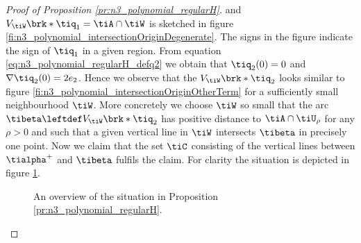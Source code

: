 \begin{proof}[Proof of Proposition \ref{pr:n3_polynomial_regularH}]
  and $V_{\tiW}\brk*{\tiq_1}=\tiA\cap\tiW$ is
  sketched in figure \ref{fi:n3_polynomial_intersectionOriginDegenerate}.
  The signs in the figure indicate the sign of $\tiq_1$ in a given region.
  From equation \eqref{eq:n3_polynomial_regularH_defq2}
  we obtain that $\tiq_2(0)=0$ and $\nabla \tiq_2(0)=2e_2$.
  Hence we observe that the $V_{\tiW}\brk*{\tiq_2}$ looks similar to figure \ref{fi:n3_polynomial_intersectionOriginOtherTerm}
  for a sufficiently small neighbourhood $\tiW$.
  More concretely we choose $\tiW$ so small that the arc $\tibeta\leftdef V_{\tiW}\brk*{\tiq_2}$ has positive distance to $\tiA\cap \tiU_\rho$ for
  any $\rho>0$ and such that a given vertical line in $\tiW$ intersects $\tibeta$ in precisely one point.
  Now we claim that the set $\tiC$ consisting of the vertical lines between $\tialpha^+$
  and $\tibeta$ fulfils the claim. For clarity the situation is depicted in figure \ref{fi:n3_polynomial_intersectionOrigin_overview}.
  \begin{figure}
    \centering
    
    \caption{An overview of the situation in Proposition \ref{pr:n3_polynomial_regularH}.}
    \label{fi:n3_polynomial_intersectionOrigin_overview}
  \end{figure}


\end{proof}
